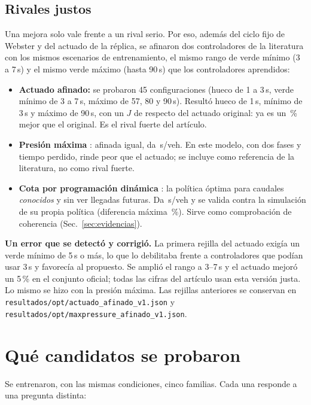 \documentclass[11pt,a4paper]{article}
\begin{document}
\subsection{Rivales justos}
\label{sec:referencias}
Una mejora solo vale frente a un rival serio. Por eso, además del ciclo fijo de Webster y del actuado de la réplica, se afinaron dos controladores de la literatura con los mismos escenarios de entrenamiento, el mismo rango de verde mínimo (3 a 7\,s) y el mismo verde máximo (hasta 90\,s) que los controladores aprendidos:
\begin{itemize}
\item \textbf{Actuado afinado:} se probaron 45 configuraciones (hueco de 1 a 3\,s, verde mínimo de 3 a 7\,s, máximo de 57, 80 y 90\,s). Resultó hueco de 1\,s, mínimo de 3\,s y máximo de 90\,s, con un $J$ de \JActAfRatio{} respecto del actuado original: ya es un \JActAfMejora\,\% mejor que el original. Es el rival fuerte del artículo.
\item \textbf{Presión máxima} \cite{Varaiya2013}: afinada igual, da \DelayOfMax{}\,s/veh. En este modelo, con dos fases y tiempo perdido, rinde peor que el actuado; se incluye como referencia de la literatura, no como rival fuerte.
\item \textbf{Cota por programación dinámica} \cite{Puterman1994}: la política óptima para caudales \emph{conocidos} y sin ver llegadas futuras. Da \DelayOfMdp{}\,s/veh y se valida contra la simulación de su propia política (diferencia máxima \PdMaxDif\,\%). Sirve como comprobación de coherencia (Sec.~\ref{sec:evidencias}).
\end{itemize}
\textbf{Un error que se detectó y corrigió.} La primera rejilla del actuado exigía un verde mínimo de 5\,s o más, lo que lo debilitaba frente a controladores que podían usar 3\,s y favorecía al propuesto. Se amplió el rango a 3--7\,s y el actuado mejoró un 5\,\% en el conjunto oficial; todas las cifras del artículo usan esta versión justa. Lo mismo se hizo con la presión máxima. Las rejillas anteriores se conservan en \texttt{resultados/opt/actuado\_afinado\_v1.json} y \texttt{resultados/opt/maxpressure\_afinado\_v1.json}.

\section{Qué candidatos se probaron}
\label{sec:candidatos}

Se entrenaron, con las mismas condiciones, cinco familias. Cada una responde a una pregunta distinta:
\end{document}
